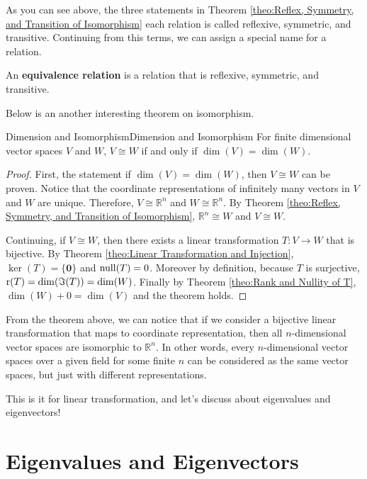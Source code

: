 \documentclass[../main.tex]{subfiles}
\begin{document}
As you can see above, the three statements in Theorem
\ref{theo:Reflex, Symmetry, and Transition of Isomorphism} each
relation is called reflexive, symmetric, and transitive. Continuing
from this terms, we can assign a special name for a relation.

\begin{definition}
An \textbf{equivalence relation} is a relation that is reflexive,
symmetric, and transitive.
\end{definition}

Below is an another interesting theorem on isomorphism.

\begin{theorem}{Dimension and Isomorphism}{Dimension and Isomorphism}
For finite dimensional vector spaces $V$ and $W$, $V \cong W$ if and
only if $\dim(V) = \dim(W)$.
\end{theorem}
\begin{proof}
First, the statement if $\dim(V) = \dim(W)$, then $V \cong W$ can be
proven. Notice that the coordinate representations of infinitely many
vectors in $V$ and $W$ are unique. Therefore, $V \cong \mathbb{R}^n$
and $W \cong \mathbb{R}^n$. By Theorem \ref{theo:Reflex, Symmetry, and
Transition of Isomorphism}, $\mathbb{R}^n \cong W$ and $V \cong W$.

Continuing, if $V \cong W$, then there exists a linear transformation
$T: V \to W$ that is bijective. By Theorem \ref{theo:Linear
Transformation and Injection}, $\ker(T) = \{ \mathbf{0} \}$ and
$\operatorname{null}(T) = 0$. Moreover by definition, because $T$ is surjective,
$\operatorname{r}(T) = \dim(\Im(T)) = \dim(W)$. Finally by Theorem \ref{theo:Rank
and Nullity of T}, $\dim(W) + 0 = \dim(V)$ and the theorem holds.
\end{proof}

From the theorem above, we can notice that if we consider a bijective
linear transformation that maps to coordinate representation, then
all $n$-dimensional vector spaces are isomorphic to $\mathbb{R}^n$.
In other words, every $n$-dimensional vector spaces over a given
field for some finite $n$ can be considered as the same vector spaces,
but just with different representations.

This is it for linear transformation, and let's discuss about
eigenvalues and eigenvectors!

\section{Eigenvalues and Eigenvectors}
\end{document}
